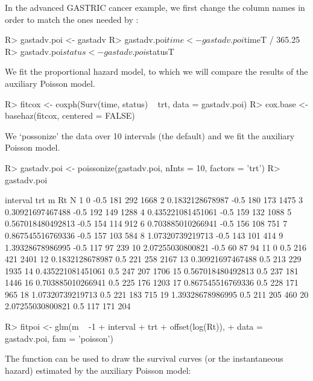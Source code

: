 \documentclass[article,shortnames, nojss]{jss}\usepackage[]{graphicx}\usepackage[]{color}
\begin{document}
In the advanced GASTRIC cancer example,
  we first change the column names in order to match the ones needed by
  :
\begin{Schunk}
\begin{Sinput}
R>   gastadv.poi <- gastadv
R>   gastadv.poi$time <- gastadv.poi$timeT / 365.25
R>   gastadv.poi$status <- gastadv.poi$statusT
\end{Sinput}
\end{Schunk}
We fit the proportional hazard model, to which we will compare
  the results of the auxiliary Poisson model.
\begin{Schunk}
\begin{Sinput}
R>   fitcox <- coxph(Surv(time, status) ~ trt, data = gastadv.poi)
R>   cox.base <- basehaz(fitcox, centered = FALSE)
\end{Sinput}
\end{Schunk}
We `possonize' the data over 10 intervals (the default)
  and we fit the auxiliary Poisson model.
\begin{Schunk}
\begin{Sinput}
R>   gastadv.poi <- poissonize(gastadv.poi, nInts = 10, factors = 'trt')
R>   gastadv.poi
\end{Sinput}
\begin{Soutput}
            interval  trt   m  Rt    N
1                  0 -0.5 181 292 1668
2    0.1832128678987 -0.5 180 173 1475
3   0.30921697467488 -0.5 192 149 1288
4  0.435221081451061 -0.5 159 132 1088
5  0.567018480492813 -0.5 154 114  912
6  0.703885010266941 -0.5 156 108  751
7  0.867545516769336 -0.5 157 103  584
8   1.07320739219713 -0.5 143 101  414
9   1.39328678986995 -0.5 117  97  239
10  2.07255030800821 -0.5  60  87   94
11                 0  0.5 216 421 2401
12   0.1832128678987  0.5 221 258 2167
13  0.30921697467488  0.5 213 229 1935
14 0.435221081451061  0.5 247 207 1706
15 0.567018480492813  0.5 237 181 1446
16 0.703885010266941  0.5 225 176 1203
17 0.867545516769336  0.5 228 171  965
18  1.07320739219713  0.5 221 183  715
19  1.39328678986995  0.5 211 205  460
20  2.07255030800821  0.5 117 171  204
\end{Soutput}
\begin{Sinput}
R>   fitpoi <- glm(m ~ -1 + interval + trt + offset(log(Rt)), 
+                 data = gastadv.poi, fam = 'poisson')
\end{Sinput}
\end{Schunk}
The function  can be used to draw the survival curves
  (or the instantaneous hazard) estimated by the auxiliary Poisson model:
\end{document}
